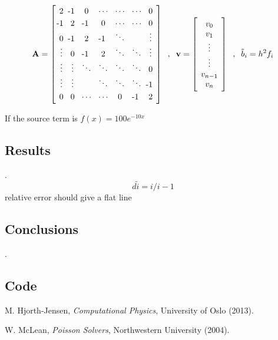 \documentclass[11pt]{article}
\begin{document}
    \[ \arraycolsep 1.0ex \mathbf{A} = \left[ \begin{array}{c c c c c c c} 
    \vspace{.1cm} 2 & \llap{-}1 & 0 & \cdots & \cdots & \cdots & 0 \\
    \llap{-}1 & 2 & \llap{-}1 & 0 & \cdots & \cdots & 0 \\
    0 & \llap{-}1 & 2 & \llap{-}1 & \ddots &  & \vdots \\
    \vdots & 0 & \llap{-}1 & 2 & \ddots & \ddots & \vdots \\
    \vdots & \vdots & \ddots &\ddots&\ddots&\ddots&0 \\
    \vdots &\vdots&&\ddots&\ddots&\ddots& \llap{-}1 \vspace{.1cm} \\ 
    0 &0&\cdots&\cdots&0&\llap{-}1& 2 
    \end{array} \right] \;\; , \;\; \bold{v} = \left[ \begin{array}{c} v_0 \\ v_1 \\ \vdots \\ \vdots \\ v_{n-1} \\ v_n \end{array} \right] \;\; , \;\; \tilde{b}_i = h^2 f_i \]

    If the source term is $f(x) = 100e^{-10x}$ 

\subsection{Results}

    .  \[ d\tilde{i}=i/i-1 \] relative error should give a flat line

\subsection{Conclusions}

    .

\subsection{Code}

    

    

\begin{thebibliography}{1}

     M. Hjorth-Jensen, {\em Computational Physics}, University of Oslo (2013).

     W. McLean, {\em Poisson Solvers}, Northwestern University (2004).

\end{thebibliography}
\end{document}
